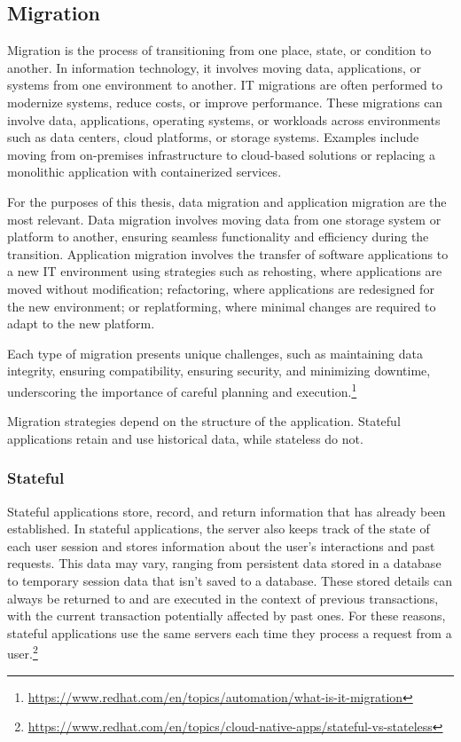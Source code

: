 %
\subsection{Migration}
%
Migration is the process of transitioning from one place, state, or condition to another. In information technology, it involves moving data, applications, or systems from one environment to another. IT migrations are often performed to modernize systems, reduce costs, or improve performance. These migrations can involve data, applications, operating systems, or workloads across environments such as data centers, cloud platforms, or storage systems. Examples include moving from on-premises infrastructure to cloud-based solutions or replacing a monolithic application with containerized services.

For the purposes of this thesis, data migration and application migration are the most relevant. Data migration involves moving data from one storage system or platform to another, ensuring seamless functionality and efficiency during the transition. Application migration involves the transfer of software applications to a new IT environment using strategies such as rehosting, where applications are moved without modification; refactoring, where applications are redesigned for the new environment; or replatforming, where minimal changes are required to adapt to the new platform.

Each type of migration presents unique challenges, such as maintaining data integrity, ensuring compatibility, ensuring security, and minimizing downtime, underscoring the importance of careful planning and execution.\footnote{\url{https://www.redhat.com/en/topics/automation/what-is-it-migration}}

Migration strategies depend on the structure of the application. Stateful applications retain and use historical data, while stateless do not.

\subsubsection{Stateful}
Stateful applications store, record, and return information that has already been established. In stateful applications, the server also keeps track of the state of each user session and stores information about the user's interactions and past requests. This data may vary, ranging from persistent data stored in a database to temporary session data that isn't saved to a database. These stored details can always be returned to and are executed in the context of previous transactions, with the current transaction potentially affected by past ones. For these reasons, stateful applications use the same servers each time they process a request from a user.\footnote{\url{https://www.redhat.com/en/topics/cloud-native-apps/stateful-vs-stateless}}

